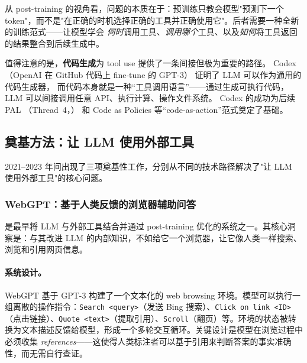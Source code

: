 从 post-training 的视角看，问题的本质在于：预训练只教会模型"预测下一个 token"，而不是"在正确的时机选择正确的工具并正确使用它"。后者需要一种全新的训练范式——让模型学会 \emph{何时}调用工具、\emph{调用哪个}工具、以及\emph{如何}将工具返回的结果整合到后续生成中。

值得注意的是，\textbf{代码生成}为 tool use 提供了一条间接但极为重要的路径。
Codex \cite{chen2021codex}（OpenAI 在 GitHub 代码上 fine-tune 的 GPT-3）
证明了 LLM 可以作为通用的代码生成器，
而代码本身就是一种``工具调用语言''——通过生成可执行代码，
LLM 可以间接调用任意 API、执行计算、操作文件系统。
Codex 的成功为后续 PAL \cite{gao2022pal}（Thread~4，）
和 Code as Policies \cite{liang2023codepolicies} 等``code-as-action''范式奠定了基础。


\subsection{奠基方法：让 LLM 使用外部工具}
\label{sec:t6-foundation}

2021--2023 年间出现了三项奠基性工作，分别从不同的技术路径解决了"让 LLM 使用外部工具"的核心问题。

\subsubsection{WebGPT：基于人类反馈的浏览器辅助问答}

 是最早将 LLM 与外部工具结合并通过 post-training 优化的系统之一。其核心洞察是：与其改进 LLM 的内部知识，不如给它一个浏览器，让它像人类一样搜索、浏览和引用网页信息。

\paragraph{系统设计。} WebGPT 基于 GPT-3 构建了一个文本化的 web browsing 环境。模型可以执行一组离散的操作指令：\texttt{Search <query>}（发送 Bing 搜索）、\texttt{Click on link <ID>}（点击链接）、\texttt{Quote <text>}（提取引用）、\texttt{Scroll}（翻页）等。环境的状态被转换为文本描述反馈给模型，形成一个多轮交互循环。关键设计是模型在浏览过程中必须收集 \emph{references}——这使得人类标注者可以基于引用来判断答案的事实准确性，而无需自行查证。


